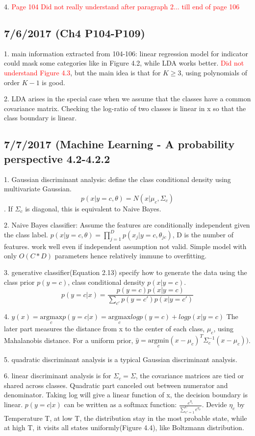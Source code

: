 \documentclass[a4paper, 12pt]{article}
\begin{document}
4. \textcolor{red}{Page 104 Did not really understand after paragraph 2... till end of page 106 }

\subsection*{7/6/2017 (Ch4 P104-P109)}

1. main information extracted from 104-106: linear regression model for indicator could mask some categories like in Figure 4.2, while LDA works better.  \textcolor{red}{Did not understand Figure 4.3}, but the main idea is that for $K \ge 3$, using polynomials of order $K-1$ is good.

2. LDA arises in the special case when we assume that the classes have a common covariance matrix. Checking the log-ratio of two classes is linear in x so that the class boundary is linear.

\subsection*{7/7/2017 (Machine Learning - A probability perspective 4.2-4.2.2}

1. Gaussian discriminant analysis: define the class conditional density using multivariate Gaussian. $$p(x|y=c,\theta)=N(x|\mu_c,\Sigma_c)$$. If $\Sigma_c$ is diagonal, this is equivalent to Naive Bayes.

2. Naive Bayes classifier: Assume the features are conditionally independent given the class label. $p(x|y=c,\theta)=\prod_{j=1}^{D}p(x_j|y=c,\theta_{jc})$, D is the number of features. work well even if independent assumption not valid. Simple model with only $O(C*D)$ parameters hence relatively immune to overfitting.

3. generative classifier(Equation 2.13) specify how to generate the data using the class prior $p(y=c)$, class conditional density $p(x|y=c)$.
$$p(y=c|x)=\frac{p(y=c)p(x|y=c)}{\sum_{c'}^{}p(y=c')p(x|y=c')}$$

4. $\hat{y}(x)=\underset{c}{\mathrm{argmax}} p(y=c|x)= \underset{c}{\mathrm{argmax}} logp(y=c) + logp(x|y=c) $ The later part measures the distance from x to the center of each class, $\mu_c$, using Mahalanobis distance. For a uniform prior, $\hat{y}=\underset{c}{\mathrm{argmin}} (x-\mu_c)^T\Sigma_c^{-1}(x-\mu_c))$.

5. quadratic discriminant analysis is a typical Gaussian discriminant analysis.

6. linear discriminant analysis is for $\Sigma_c=\Sigma$, the covariance matrices are tied or shared across classes. Quadratic part canceled out between numerator and denominator. Taking log will give a linear function of x, the decision boundary is linear. $p(y=c|x)$ can be written as a softmax function: $\frac{e^{\eta_c}}{\sum_{c'=1}^{C}e^{\eta_{c'}}}$. Devide $\eta_c$ by Temperature T, at low T, the distribution stay in the most probable state, while at high T, it visits all states uniformly(Figure 4.4), like Boltzmann distribution.
	
\end{document}

